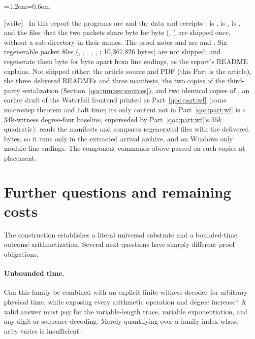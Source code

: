 \documentclass[11pt,letterpaper]{article}
\theoremstyle{definition}
\theoremstyle{remark}
\newcommand{\wtag}{\textup{[write]}}
\newenvironment{writenote}{\par\smallskip\begin{list}{}{\leftmargin=1.2em\rightmargin=0.6em}\item[]\small\wtag\ }{\end{list}\smallskip}
\begin{document}
\begin{writenote}
In this report the programs are  and the data and receipts :  is ,  is ,  is , and the files that the two packets share byte for byte (, ) are shipped once, without a sub-directory in their names. The proof notes  and  are  and . Six regenerable packet files (, , , , , ; 10,367,826 bytes) are not shipped:  and  regenerate them byte for byte apart from line endings, as the report's README explains. Not shipped either: the article source and PDF (this Part is the article), the three delivered READMEs and three manifests, the two copies of the third-party serialization (Section~\ref{qoc:um:sec:sources}), and two identical copies of , an earlier draft of the Waterfall frontend printed as Part~\ref{qoc:part:wf} (same macrostep theorem and halt time; its only content not in Part~\ref{qoc:part:wf} is a 34k-witness degree-four baseline, superseded by Part~\ref{qoc:part:wf}'s $35k$ quadratic).  reads the manifests and compares regenerated files with the delivered bytes, so it runs only in the extracted arrival archive, and on Windows only modulo line endings. The component commands above passed on such copies at placement.
\end{writenote}


\section{Further questions and remaining costs}\label{qoc:um:sec:future}
The construction establishes a literal universal substrate and a bounded-time outcome arithmetization. Several next questions have sharply different proof obligations.

\paragraph{Unbounded time.}
Can this family be combined with an explicit finite-witness decoder for arbitrary physical time, while exposing every arithmetic operation and degree increase? A valid answer must pay for the variable-length trace, variable exponentiation, and any digit or sequence decoding. Merely quantifying over a family index whose arity varies is insufficient.
\end{document}
